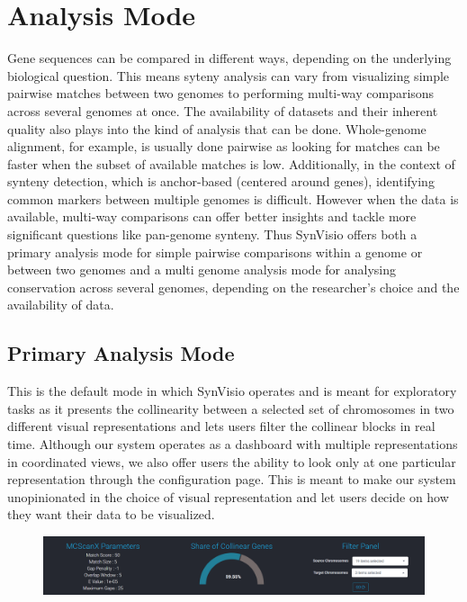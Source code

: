 \section{Analysis Mode}
Gene sequences can be compared in different ways, depending on the underlying biological question. This means syteny analysis can vary from visualizing simple pairwise matches between two genomes to performing  multi-way comparisons across several genomes at once. The availability of datasets and their inherent quality also plays into the kind of analysis that can be done. Whole-genome alignment, for example, is usually done pairwise as looking for matches can be faster when the subset of available matches is low. Additionally, in the context of synteny detection, which is anchor-based (centered around genes), identifying common markers between multiple genomes is difficult\cite{wang2012mcscanx}. However when the data is available, multi-way comparisons can offer better insights and tackle more significant questions like pan-genome synteny. Thus SynVisio offers both a primary analysis mode for simple pairwise comparisons within a genome or between two genomes and a multi genome analysis mode for analysing conservation across several genomes, depending on the researcher's choice and the availability of data.

\subsection{Primary Analysis Mode}
This is the default mode in which SynVisio operates and is meant for exploratory tasks as it presents the collinearity between a selected set of chromosomes in two different visual representations and lets users filter the collinear blocks in real time. Although our system operates as a dashboard with multiple representations in coordinated views, we also offer users the ability to look only at one particular representation through the configuration page. This is meant to make our system unopinionated in the choice of visual representation and let users decide on how they want their data to be visualized. 

\begin{figure}
  \centering
  \includegraphics[width=1\linewidth]{images/ch_5_baseparameters.PNG}
  \label{fig:ch_5_baseparameters}
\end{figure}


